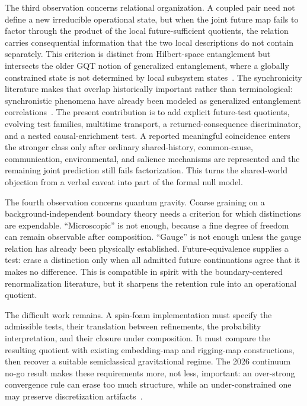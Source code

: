 \documentclass[11pt]{article}
\begin{document}
The third observation concerns relational organization. A coupled pair need not define a new irreducible operational state, but when the joint future map fails to factor through the product of the local future-sufficient quotients, the relation carries consequential information that the two local descriptions do not contain separately. This criterion is distinct from Hilbert-space entanglement but intersects the older GQT notion of generalized entanglement, where a globally constrained state is not determined by local subsystem states~\cite{filkromer2011}. The synchronicity literature makes that overlap historically important rather than terminological: synchronistic phenomena have already been modeled as generalized entanglement correlations~\cite{lucadou2007}. The present contribution is to add explicit future-test quotients, evolving test families, multitime transport, a returned-consequence discriminator, and a nested causal-enrichment test. A reported meaningful coincidence enters the stronger class only after ordinary shared-history, common-cause, communication, environmental, and salience mechanisms are represented and the remaining joint prediction still fails factorization. This turns the shared-world objection from a verbal caveat into part of the formal null model.

The fourth observation concerns quantum gravity. Coarse graining on a background-independent boundary theory needs a criterion for which distinctions are expendable. ``Microscopic'' is not enough, because a fine degree of freedom can remain observable after composition. ``Gauge'' is not enough unless the gauge relation has already been physically established. Future-equivalence supplies a test: erase a distinction only when all admitted future continuations agree that it makes no difference. This is compatible in spirit with the boundary-centered renormalization literature, but it sharpens the retention rule into an operational quotient.

The difficult work remains. A spin-foam implementation must specify the admissible tests, their translation between refinements, the probability interpretation, and their closure under composition. It must compare the resulting quotient with existing embedding-map and rigging-map constructions, then recover a suitable semiclassical gravitational regime. The 2026 continuum no-go result makes these requirements more, not less, important: an over-strong convergence rule can erase too much structure, while an under-constrained one may preserve discretization artifacts~\cite{bruno2026}.
\end{document}
